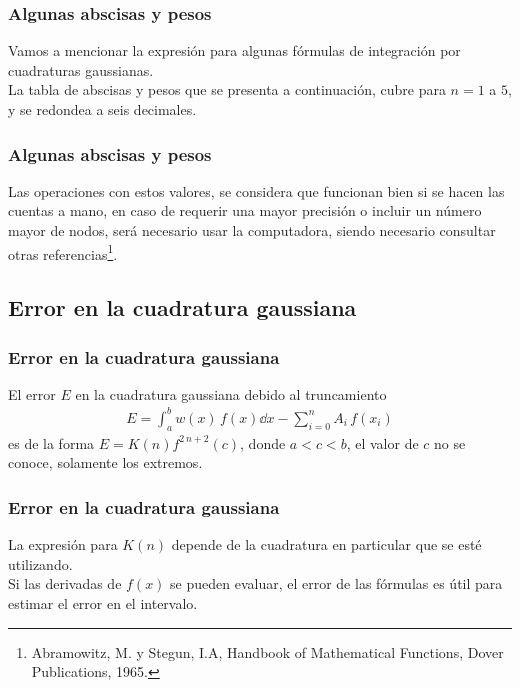 \begin{frame}
\frametitle{Algunas abscisas y pesos}
Vamos a mencionar la expresión para algunas fórmulas de integración por cuadraturas gaussianas.
\\
\bigskip
La tabla de abscisas y pesos que se presenta a continuación, cubre para $n=1$ a $5$, y se redondea a seis decimales.
\end{frame}
\begin{frame}
\frametitle{Algunas abscisas y pesos}
Las operaciones con estos valores, se considera que funcionan bien si se hacen las cuentas a mano, en caso de requerir una mayor precisión o incluir un número  mayor de nodos, será necesario usar la computadora, siendo necesario consultar otras referencias\footnote{Abramowitz, M. y Stegun, I.A, Handbook of Mathematical Functions, Dover Publications, 1965.}.
\end{frame}
\subsection{Error en la cuadratura gaussiana}
\begin{frame}
\frametitle{Error en la cuadratura gaussiana}
El error $E$ en la cuadratura gaussiana debido al truncamiento
\begin{align*}
E = \int_{a}^{b} w(x) \, f(x) \dd{x}  - \sum_{i=0}^{n} A_{i} \, f(x_{i})
\end{align*}
es de la forma $E= K(n) f^{2 \,n + 2} (c) $, donde $a < c < b$, el valor de $c$ no se conoce, solamente los extremos.
\end{frame}
\begin{frame}
\frametitle{Error en la cuadratura gaussiana}
La expresión para $K(n)$ depende de la cuadratura en particular que se esté utilizando.
\\
\bigskip
Si las derivadas de $f(x)$ se pueden evaluar, el error de las fórmulas es útil para estimar el error en el intervalo.
\end{frame}
